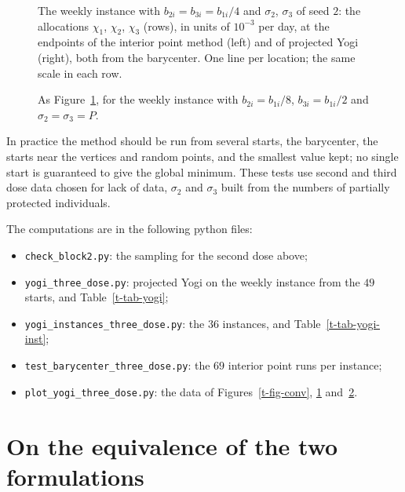 \documentclass[11pt]{article}
\theoremstyle{plain}
\theoremstyle{definition}
\theoremstyle{remark}
\numberwithin{equation}{section}
\numberwithin{figure}{section}
\numberwithin{table}{section}
\begin{document}
\begin{figure}[ht]
\centering
{}
\caption{The weekly instance with $b_{2i}=b_{3i}=b_{1i}/4$ and $\sigma_2$,
$\sigma_3$ of seed $2$: the allocations $\chi_1$, $\chi_2$, $\chi_3$ (rows),
in units of $10^{-3}$ per day, at the endpoints of the interior point method
(left) and of projected Yogi (right), both from the barycenter. One
line per location; the same scale in each row.}\label{t-fig-alloc-s2}
\end{figure}

\begin{figure}[ht]
\centering
{}
\caption{As Figure~\ref{t-fig-alloc-s2}, for the weekly instance with
$b_{2i}=b_{1i}/8$, $b_{3i}=b_{1i}/2$ and $\sigma_2=\sigma_3=P$.}\label{t-fig-alloc-p}
\end{figure}

In practice the method should be run from several starts, the barycenter, the
starts near the vertices and random points, and the smallest value kept; no
single start is guaranteed to give the global minimum. These tests use second
and third dose data chosen for lack of data, $\sigma_2$ and $\sigma_3$ built
from the numbers of partially protected individuals.

The computations are in the following python files:
\begin{itemize}
\item \texttt{check\_block2.py}: the sampling for the second dose above;
\item \texttt{yogi\_three\_dose.py}: projected Yogi on the weekly
instance from the $49$ starts, and Table~\ref{t-tab-yogi};
\item \texttt{yogi\_instances\_three\_dose.py}: the $36$ instances, and
Table~\ref{t-tab-yogi-inst};
\item \texttt{test\_barycenter\_three\_dose.py}: the $69$ interior point runs
per instance;
\item \texttt{plot\_yogi\_three\_dose.py}: the data of
Figures~\ref{t-fig-conv}, \ref{t-fig-alloc-s2} and~\ref{t-fig-alloc-p}.
\end{itemize}

\appendix

\section{On the equivalence of the two formulations}\label{sec-reduction}
\end{document}
